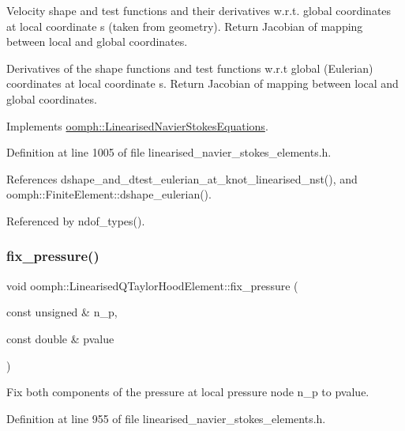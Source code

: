 Velocity shape and test functions and their derivatives w.\+r.\+t. global coordinates at local coordinate s (taken from geometry). Return Jacobian of mapping between local and global coordinates. 

Derivatives of the shape functions and test functions w.\+r.\+t global (Eulerian) coordinates at local coordinate s. Return Jacobian of mapping between local and global coordinates. 

Implements \hyperlink{classoomph_1_1LinearisedNavierStokesEquations_afb0b66566d03c7f9d8129614297e63ed}{oomph\+::\+Linearised\+Navier\+Stokes\+Equations}.



Definition at line 1005 of file linearised\+\_\+navier\+\_\+stokes\+\_\+elements.\+h.



References dshape\+\_\+and\+\_\+dtest\+\_\+eulerian\+\_\+at\+\_\+knot\+\_\+linearised\+\_\+nst(), and oomph\+::\+Finite\+Element\+::dshape\+\_\+eulerian().



Referenced by ndof\+\_\+types().

\mbox{\label{classoomph_1_1LinearisedQTaylorHoodElement_a09568188690809c7ef85f4e524c4ee7c}} 
\subsubsection{\texorpdfstring{fix\+\_\+pressure()}{fix\_pressure()}}
{\footnotesize\ttfamily void oomph\+::\+Linearised\+Q\+Taylor\+Hood\+Element\+::fix\+\_\+pressure (\begin{DoxyParamCaption}\item[{const unsigned \&}]{n\+\_\+p,  }\item[{const double \&}]{pvalue }\end{DoxyParamCaption})\hspace{0.3cm}{\ttfamily [inline]}}



Fix both components of the pressure at local pressure node n\+\_\+p to pvalue. 



Definition at line 955 of file linearised\+\_\+navier\+\_\+stokes\+\_\+elements.\+h.



